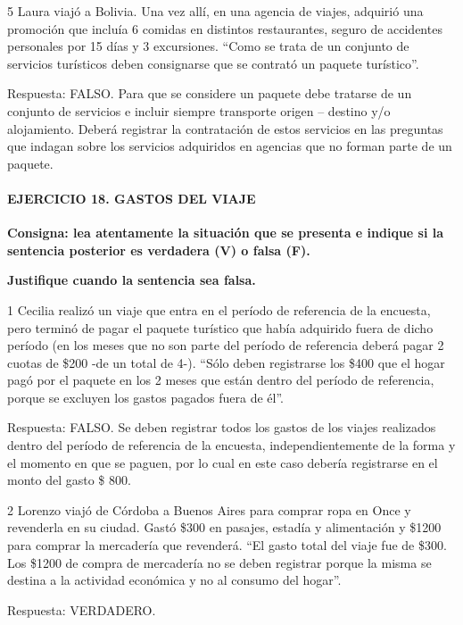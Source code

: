 \documentclass[
  openany]{book}
\begin{document}
5 Laura viajó a Bolivia. Una vez allí, en una agencia de viajes, adquirió una promoción que incluía 6 comidas en distintos restaurantes, seguro de accidentes personales por 15 días y 3 excursiones.
``Como se trata de un conjunto de servicios turísticos deben consignarse que se contrató un paquete turístico''.

Respuesta: FALSO. Para que se considere un paquete debe tratarse de un conjunto de servicios e incluir siempre transporte origen -- destino y/o alojamiento. Deberá registrar la contratación de estos servicios en las preguntas que indagan sobre los servicios adquiridos en agencias que no forman parte de un paquete.

\hypertarget{ejercicio-18.-gastos-del-viaje-1}{%
\paragraph{\texorpdfstring{\textbf{EJERCICIO 18. GASTOS DEL VIAJE}}{EJERCICIO 18. GASTOS DEL VIAJE}}\label{ejercicio-18.-gastos-del-viaje-1}}

\textbf{Consigna: lea atentamente la situación que se presenta e indique si la sentencia posterior es verdadera (V) o falsa (F).}

\textbf{Justifique cuando la sentencia sea falsa.}

1 Cecilia realizó un viaje que entra en el período de referencia de la encuesta, pero terminó de pagar el paquete turístico que había adquirido fuera de dicho período (en los meses que no son parte del período de referencia deberá pagar 2 cuotas de \$200 -de un total de 4-).
``Sólo deben registrarse los \$400 que el hogar pagó por el paquete en los 2 meses que están dentro del período de referencia, porque se excluyen los gastos pagados fuera de él''.

Respuesta: FALSO. Se deben registrar todos los gastos de los viajes realizados dentro del período de referencia de la encuesta, independientemente de la forma y el momento en que se paguen, por lo cual en este caso debería registrarse en el monto del gasto \$ 800.

2 Lorenzo viajó de Córdoba a Buenos Aires para comprar ropa en Once y revenderla en su ciudad. Gastó \$300 en pasajes, estadía y alimentación y \$1200 para comprar la mercadería que revenderá.
``El gasto total del viaje fue de \$300. Los \$1200 de compra de mercadería no se deben registrar porque la misma se destina a la actividad económica y no al consumo del hogar''.

Respuesta: VERDADERO.
\end{document}

